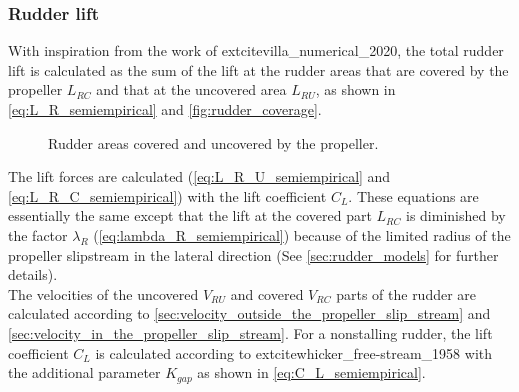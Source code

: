 \subsubsection{Rudder lift}
\label{sec:rudder lift}
With inspiration from the work of 	extcite{villa_numerical_2020}, the total rudder lift is calculated as the sum of the lift at the rudder areas that are covered by the propeller $L_{RC}$ and that at the uncovered area $L_{RU}$, as shown in \autoref{eq:L_R_semiempirical} and \autoref{fig:rudder_coverage}.
\begin{equation}
    \label{eq:L_R_semiempirical}
    
\end{equation}
%
\begin{figure}[h]
    \centering
    
    \caption{Rudder areas covered and uncovered by the propeller.}
    \label{fig:rudder_coverage}
\end{figure}
%
The lift forces are calculated (\autoref{eq:L_R_U_semiempirical} and \autoref{eq:L_R_C_semiempirical}) with the lift coefficient $C_L$. These equations are essentially the same except that the lift at the covered part $L_{RC}$ is diminished by the factor $\lambda_R$ (\autoref{eq:lambda_R_semiempirical}) because of the limited radius of the propeller slipstream in the lateral direction \cite{brix_manoeuvring_1993} (See \autoref{sec:rudder_models} for further details).
\begin{equation}
    \label{eq:L_R_U_semiempirical}
    
\end{equation}
%
\begin{equation}
    \label{eq:L_R_C_semiempirical}
    
\end{equation}
The velocities of the uncovered $V_{RU}$ and covered $V_{RC}$ parts of the rudder are calculated according to \ref{sec:velocity_outside_the_propeller_slip_stream} and \ref{sec:velocity_in_the_propeller_slip_stream}.
For a nonstalling rudder, the lift coefficient $C_L$ is calculated according to 	extcite{whicker_free-stream_1958} with the additional parameter $K_{gap}$ as shown in \autoref{eq:C_L_semiempirical}.
\begin{equation}
    \label{eq:C_L_semiempirical}
    
\end{equation}
%
\begin{equation}
    \label{eq:alpha_semiempirical}
    
\end{equation}
